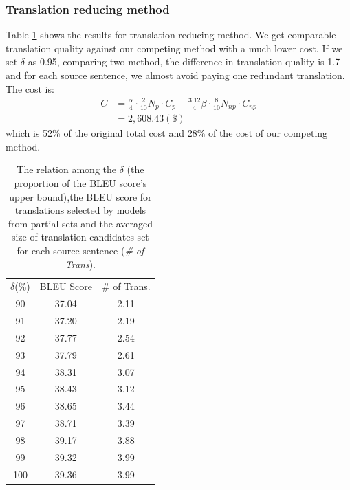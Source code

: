 \documentclass[11pt,letterpaper]{article}
\begin{document}
\subsubsection{Translation reducing method} Table \ref{orderanother} shows the results for translation reducing method. We get comparable translation quality against our competing method with a much lower cost. If we set $\delta$ as 0.95, comparing two method, the difference in translation quality is 1.7 and for each source sentence, we almost avoid paying one redundant translation. The cost is:
 \begin{align*}
  C& = \frac{\alpha}{4} \cdot \frac{2}{10} N_{p}\cdot C_{p}  + \frac{3.12}{4} \beta\cdot \frac{8}{10} N_{np} \cdot C_{np}\\
   & = 2,608.43 (\$)
 \end{align*}
 which is 52\% of the original total cost and  28\% of the cost of our competing method.
 \begin{table}[h]
 \center
\begin{tabular}{c|c|c}
\hline
$\delta$(\%) & BLEU Score & \# of Trans. \\ \hhline{===}
90    & 37.04      & 2.11             \\
91    & 37.20      & 2.19             \\
92    & 37.77      & 2.54             \\
93    & 37.79      & 2.61             \\
94    & 38.31      & 3.07             \\
95    & 38.43      & 3.12             \\
96    & 38.65      & 3.44             \\
97    & 38.71      & 3.39             \\
98    & 39.17      & 3.88             \\
99    & 39.32      & 3.99             \\
100   & 39.36      & 3.99             \\ \hline
\end{tabular}
\caption{The relation among the $\delta$ (the proportion of the BLEU score's upper bound),the BLEU score for translations selected by models from partial sets and the averaged size of translation candidates set for each source sentence (\textit{\# of Trans}).  }
    \label{orderanother}
\end{table}
\end{document}
